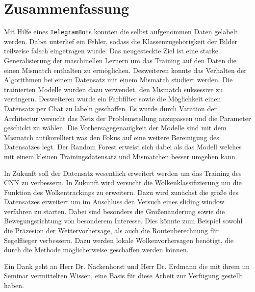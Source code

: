 \section{Zusammenfassung}
\label{sec:05_zusammenfassung}
Mit Hilfe eines \texttt{TelegramBot}s konnten die selbst aufgenommen
Daten gelabelt werden.
Dabei unterlief ein Fehler, sodass die Klassenzugehörigkeit der Bilder teilweise
falsch eingetragen wurde.
Das neugesteckte Ziel ist eine starke Generalisierung der maschinellen Lernern 
um das Training auf den Daten die einen Mismatch enthalten zu ermöglichen.
Desweiteren konnte das Verhalten der Algorithmen bei einem Datensatz
mit einem Mismatch studiert werden.
Die trainierten Modelle wurden dazu verwendet, den Mismatch 
suksessive zu verringern.
Desweiteren wurde ein Farbfilter sowie die Möglichkeit einen 
Datensatz per Chat zu labeln geschaffen.
Es wurde durch Varation der Architectur versucht das Netz der Problemstellung
anzupassen und die Parameter geschickt zu wählen.
Die Vorhersagegenauigkeit der Modelle sind mit dem Mismatch antikorelliert was
den Fokus auf eine weitere Bereinigung des Datensatzes legt.
Der Random Forest erweist sich dabei als das Modell welches mit 
einem kleinen Trainingsdatensatz und Mismatchen besser umgehen 
kann.

In Zukunft soll der Datensatz wesentlich erweitert werden um das 
Training des CNN zu verbessern.
In Zukunft wird versucht die Wolkenklassifizierung um die Funktion des
Wolkentrackings zu erweitern.
Dazu wird zunächst die größe des Datensatzes erweitert um im Anschluss den
Versuch eines sliding window verfahren zu starten.
Dabei sind besonders die Größenänderung sowie die Bewegungsrichtung von
besonderem Interesse.
Dies könnte zum Beispiel sowohl die Präzesion der Wettervorhersage, als auch 
die Routenberechnung für Segelflieger verbessern. 
Dazu werden lokale Wolkenvorhersagen benötigt, die durch die Methode
möglicherweise geschaffen werden können.

\vspace{3em}

Ein Dank geht an Herr Dr. Nackenhorst und Herr Dr. Erdmann die mit ihrem im
Seminar vermittelten Wissen, eine Basis für diese Arbeit zur Verfügung gestellt
haben.

